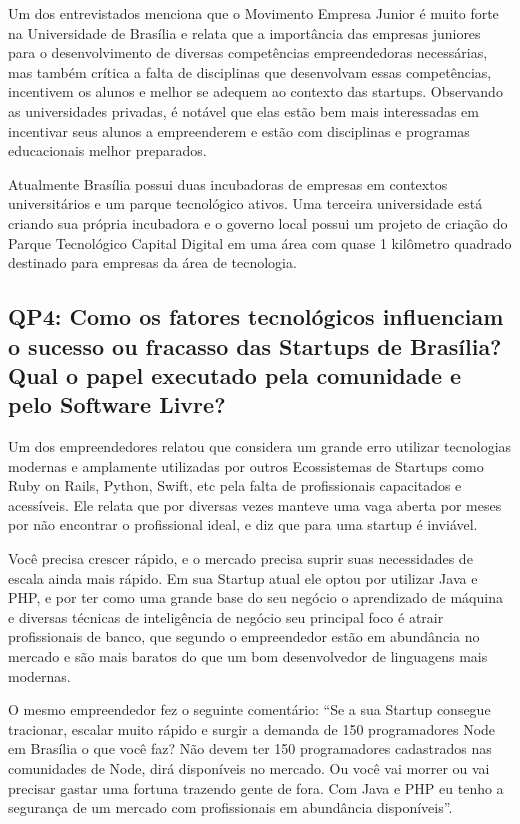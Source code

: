 Um dos entrevistados menciona que o Movimento Empresa Junior é muito forte na Universidade de Brasília e relata que a importância das empresas juniores para o desenvolvimento de diversas competências empreendedoras necessárias, mas também crítica a falta de disciplinas que desenvolvam essas competências, incentivem os alunos e melhor se adequem ao contexto das startups. Observando as universidades privadas, é notável que elas estão bem mais interessadas em incentivar seus alunos a empreenderem e estão com disciplinas e programas educacionais melhor preparados.

Atualmente Brasília possui duas incubadoras de empresas em contextos universitários e um parque tecnológico ativos. Uma terceira universidade está criando sua própria incubadora e o governo local possui um projeto de criação do Parque Tecnológico Capital Digital em uma área com quase 1 kilômetro quadrado destinado para empresas da área de tecnologia.

\subsection{QP4: Como os fatores tecnológicos influenciam o sucesso ou fracasso das Startups de Brasília? Qual o papel executado pela comunidade e pelo Software Livre?}
\label{subsection:pergunta_de_pesquisa_4}

Um dos empreendedores relatou que considera um grande erro utilizar tecnologias modernas e amplamente utilizadas por outros Ecossistemas de Startups como Ruby on Rails, Python, Swift, etc pela falta de profissionais capacitados e acessíveis. Ele relata que por diversas vezes manteve uma vaga aberta por meses por não encontrar o profissional ideal, e diz que para uma startup é inviável. 

Você precisa crescer rápido, e o mercado precisa suprir suas necessidades de escala ainda mais rápido. Em sua Startup atual ele optou por utilizar Java e PHP, e por ter como uma grande base do seu negócio o aprendizado de máquina e diversas técnicas de inteligência de negócio seu principal foco é atrair profissionais de banco, que segundo o empreendedor estão em abundância no mercado e são mais baratos do que um bom desenvolvedor de linguagens mais modernas. 

O mesmo empreendedor fez o seguinte comentário: ``Se a sua Startup consegue tracionar, escalar muito rápido e surgir a demanda de 150 programadores Node em Brasília o que você faz? Não devem ter 150 programadores cadastrados nas comunidades de Node, dirá disponíveis no mercado. Ou você vai morrer ou vai precisar gastar uma fortuna trazendo gente de fora. Com Java e PHP eu tenho a segurança de um mercado com profissionais em abundância disponíveis''.

